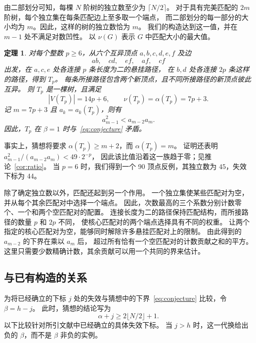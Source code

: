 \documentclass[UTF8,11pt,a4paper,fontset=fandol]{ctexart}
\newtheorem{theorem}{定理}[section]
\theoremstyle{remark}
\numberwithin{equation}{section}
\begin{document}
由二部划分可知，每棵 $N$ 阶树的独立数至少为 $\lceil N/2\rceil$。
对于具有完美匹配的 $2m$ 阶树，每个独立集在每条匹配边上至多取一个端点，
而二部划分的每一部分的大小均为 $m$。因此，这样的树的独立数恰为 $m$。
我们的构造达到这一值，并在 $m-1$ 处不满足对数凹性。
以 $\nu(G)$ 表示 $G$ 中匹配大小的最大值。

\begin{theorem}\label{thm:main}
对每个整数 $p\geq6$，从六个互异顶点 $a,b,c,d,e,f$ 及边
\[
 ab,\quad cd,\quad ef,\quad af,\quad cf
\]
出发，在 $a,c,e$ 处各连接 $p$ 条长度为二的悬挂路径，
在 $b,d$ 处各连接 $2p$ 条这样的路径，得到 $T_p$。
每条所接路径包含两个新顶点，且不同所接路径的新顶点彼此互异。
则 $T_p$ 是一棵树，且满足
\[
 |V(T_p)|=14p+6,\qquad \nu(T_p)=\alpha(T_p)=7p+3.
\]
记 $m=7p+3$ 且 $a_k=a_k(T_p)$，则有
\begin{equation}
 a_{m-1}^2<a_{m-2}a_m.
 \label{eq:failure}
\end{equation}
因此，$T_p$ 在 $\beta=1$ 时与~\eqref{eq:conjecture} 矛盾。
\end{theorem}

事实上，猜想将要求 $\alpha(T_p)\geq m+2$，而 $\alpha(T_p)=m$。
证明还表明 $a_{m-1}^2/(a_{m-2}a_m)<49\cdot2^{-p}$，
因此该比值沿着这一族趋于零；见推论~\ref{cor:ratio}。
当 $p=6$ 时，我们得到一个 90 顶点反例，其独立数为 $45$，失效下标为 $44$。

除了确定独立数以外，匹配还起到另一个作用。
一个独立集使某些匹配对为空，并从每个其余匹配对中选择一个端点。
因此，次数最高的三个系数分别计数零个、一个和两个空匹配对的配置。
连接长度为二的路径保持匹配结构，而所接路径的数量 $p$ 和 $2p$ 不同，
使核心匹配对的两个端点选择具有不同的权重。
让两个指定的核心匹配对为空，能够同时解除许多悬挂匹配对上的限制。
由此得到的 $a_{m-2}$ 的下界在乘以 $a_m$ 后，
超过所有恰有一个空匹配对的计数贡献之和的平方。
这里只需要少数精确计数，其余贡献可以用一个共同的界来估计。

\subsection{与已有构造的关系}\label{sec:related}

为将已经确立的下标 $j$ 处的失效与猜想中的下界~\eqref{eq:conjecture} 比较，令 $\beta=h-j$。
此时，猜想的结论写为
\begin{equation}\label{eq:comparison-test}
 \alpha+j\geq2\lfloor N/2\rfloor+1.
\end{equation}
以下比较针对所引文献中已经确立的具体失效下标。
当 $j>h$ 时，这一代换给出负的 $\beta$，而不是 $\beta$ 非负的实例。
\end{document}
